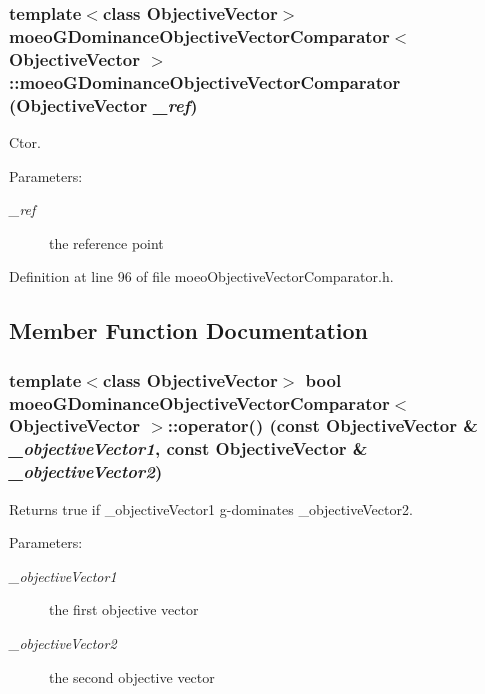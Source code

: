 \subsubsection{\setlength{\rightskip}{0pt plus 5cm}template$<$class Objective\-Vector$>$ {\bf moeo\-GDominance\-Objective\-Vector\-Comparator}$<$ Objective\-Vector $>$::{\bf moeo\-GDominance\-Objective\-Vector\-Comparator} (Objective\-Vector {\em \_\-ref})\hspace{0.3cm}{\tt  [inline]}}\label{classmoeoGDominanceObjectiveVectorComparator_3eb8db7f05eabcd94ec96a3bc5fe48ae}


Ctor. 

\begin{Desc}
\item[Parameters:]
\begin{description}
\item[{\em \_\-ref}]the reference point \end{description}
\end{Desc}


Definition at line 96 of file moeo\-Objective\-Vector\-Comparator.h.

\subsection{Member Function Documentation}
\subsubsection{\setlength{\rightskip}{0pt plus 5cm}template$<$class Objective\-Vector$>$ bool {\bf moeo\-GDominance\-Objective\-Vector\-Comparator}$<$ Objective\-Vector $>$::operator() (const Objective\-Vector \& {\em \_\-objective\-Vector1}, const Objective\-Vector \& {\em \_\-objective\-Vector2})\hspace{0.3cm}{\tt  [inline]}}\label{classmoeoGDominanceObjectiveVectorComparator_e2714bd3b21e027801ca84943e846e88}


Returns true if \_\-objective\-Vector1 g-dominates \_\-objective\-Vector2. 

\begin{Desc}
\item[Parameters:]
\begin{description}
\item[{\em \_\-objective\-Vector1}]the first objective vector \item[{\em \_\-objective\-Vector2}]the second objective vector \end{description}
\end{Desc}


